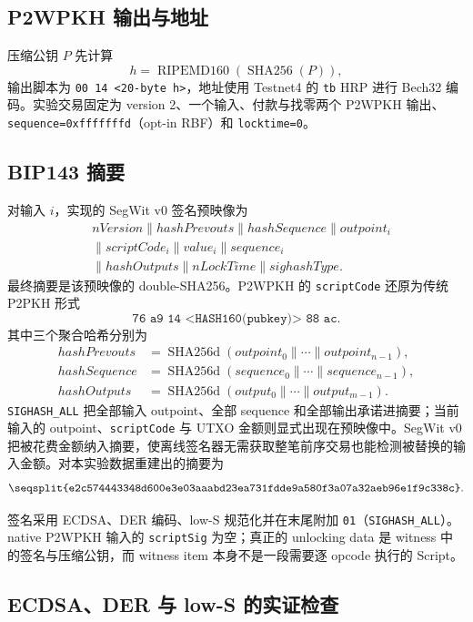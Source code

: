\documentclass[11pt,a4paper,fontset=none]{ctexart}
\begin{document}
\subsection{P2WPKH 输出与地址}

压缩公钥 $P$ 先计算
\[
 h=\operatorname{RIPEMD160}(\operatorname{SHA256}(P)),
\]
输出脚本为 \texttt{00 14 <20-byte h>}，地址使用 Testnet4 的 \texttt{tb} HRP 进行 Bech32 编码。实验交易固定为 version 2、一个输入、付款与找零两个 P2WPKH 输出、\texttt{sequence=0xfffffffd}（opt-in RBF）和 \texttt{locktime=0}。

\subsection{BIP143 摘要}

对输入 $i$，实现的 SegWit v0 签名预映像为
\begin{align*}
&nVersion \parallel hashPrevouts \parallel hashSequence \parallel outpoint_i\\
&\parallel scriptCode_i \parallel value_i \parallel sequence_i\\
&\parallel hashOutputs \parallel nLockTime \parallel sighashType.
\end{align*}
最终摘要是该预映像的 double-SHA256。P2WPKH 的 \texttt{scriptCode} 还原为传统 P2PKH 形式
\[
\texttt{76 a9 14 <HASH160(pubkey)> 88 ac}.
\]
其中三个聚合哈希分别为
\begin{align*}
 hashPrevouts &= \operatorname{SHA256d}(outpoint_0\parallel\cdots\parallel outpoint_{n-1}),\\
 hashSequence &= \operatorname{SHA256d}(sequence_0\parallel\cdots\parallel sequence_{n-1}),\\
 hashOutputs  &= \operatorname{SHA256d}(output_0\parallel\cdots\parallel output_{m-1}).
\end{align*}
\texttt{SIGHASH\_ALL} 把全部输入 outpoint、全部 sequence 和全部输出承诺进摘要；当前输入的 outpoint、\texttt{scriptCode} 与 UTXO 金额则显式出现在预映像中。SegWit v0 把被花费金额纳入摘要，使离线签名器无需获取整笔前序交易也能检测被替换的输入金额。对本实验数据重建出的摘要为
\[
\texttt{\seqsplit{e2c574443348d600e3e03aaabd23ea731fdde9a580f3a07a32aeb96e1f9c338c}}.
\]

签名采用 ECDSA、DER 编码、low-S 规范化并在末尾附加 \texttt{01}（\texttt{SIGHASH\_ALL}）。native P2WPKH 输入的 \texttt{scriptSig} 为空；真正的 unlocking data 是 witness 中的签名与压缩公钥，而 witness item 本身不是一段需要逐 opcode 执行的 Script。

\subsection{ECDSA、DER 与 low-S 的实证检查}
\end{document}
